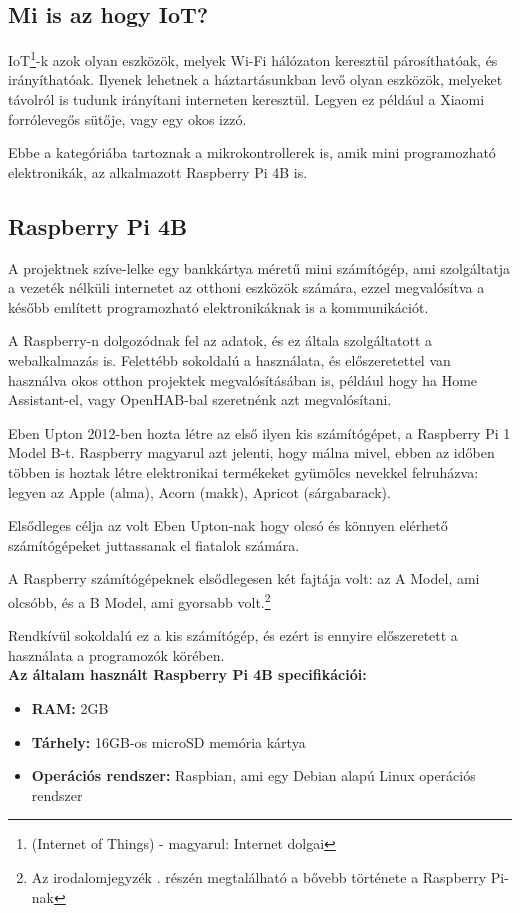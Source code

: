\documentclass[
]{thesis-ekf}
\theoremstyle{definition}
\theoremstyle{remark}
\begin{document}
	\subsection{Mi is az hogy IoT?}
	IoT\footnote{(Internet of Things) - magyarul: Internet dolgai}-k azok olyan eszközök, melyek Wi-Fi hálózaton keresztül párosíthatóak, és irányíthatóak. Ilyenek lehetnek a háztartásunkban levő olyan eszközök, melyeket távolról is tudunk irányítani interneten keresztül. Legyen ez például a Xiaomi forrólevegős sütője, vagy egy okos izzó. 
	
	Ebbe a kategóriába tartoznak a mikrokontrollerek is, amik mini programozható elektronikák, az alkalmazott Raspberry Pi 4B is.
	
	\subsection{Raspberry Pi 4B}
	A projektnek szíve-lelke egy bankkártya méretű mini számítógép, ami szolgáltatja a vezeték nélküli internetet az otthoni eszközök számára, ezzel megvalósítva a később említett programozható elektronikáknak is a kommunikációt.
	
	A Raspberry-n dolgozódnak fel az adatok, és ez általa szolgáltatott a webalkalmazás is. Felettébb sokoldalú a használata, és előszeretettel van használva okos otthon projektek megvalósításában is, például hogy ha Home Assistant-el, vagy OpenHAB-bal szeretnénk azt megvalósítani.
	
	Eben Upton 2012-ben hozta létre az első ilyen kis számítógépet, a Raspberry Pi 1 Model B-t. Raspberry magyarul azt jelenti, hogy málna mivel, ebben az időben többen is hoztak létre elektronikai termékeket gyümölcs nevekkel felruházva: legyen az Apple (alma), Acorn (makk), Apricot (sárgabarack).
	
	Elsődleges célja az volt Eben Upton-nak hogy olcsó és könnyen elérhető számítógépeket juttassanak el fiatalok számára.
	
	A Raspberry számítógépeknek elsődlegesen két fajtája volt: az A Model, ami olcsóbb, és a B Model, ami gyorsabb volt.\footnote{Az irodalomjegyzék \cite{raspberrypi-history}. részén megtalálható a bővebb története a Raspberry Pi-nak}
	
	Rendkívül sokoldalú ez a kis számítógép, és ezért is ennyire előszeretett a használata a programozók körében.\\
	\textbf{Az általam használt Raspberry Pi 4B specifikációi:}
	\begin{itemize}
		\item \textbf{RAM:} 2GB
		\item \textbf{Tárhely:} 16GB-os microSD memória kártya
		\item \textbf{Operációs rendszer:} Raspbian, ami egy Debian alapú Linux operációs rendszer
	\end{itemize}
	
\end{document}

